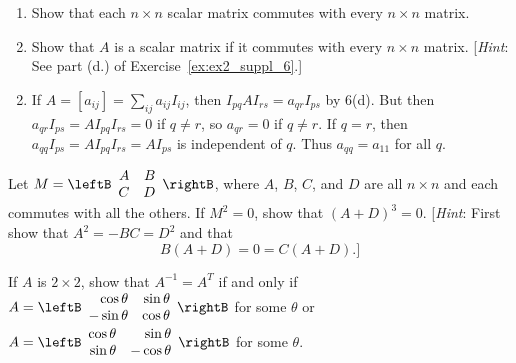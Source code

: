 \begin{multicols}{2}
\begin{supex}
\begin{enumerate}[label={\alph*.}]
\item Show that each $n \times n$ scalar matrix commutes with every $n \times n$ matrix.

\item Show that $A$ is a scalar matrix if it commutes with every $n \times n$ matrix. [\textit{Hint}: See part (d.) of Exercise~\ref{ex:ex2_suppl_6}.]

\end{enumerate}
\begin{supsol}
\begin{enumerate}[label={\alph*.}]
\setcounter{enumi}{1}
\item  If $A = \left[a_{ij}\right] = \sum_{ij}a_{ij}I_{ij}$, then $I_{pq}AI_{rs} = a_{qr}I_{ps}$ by 6(d). But then $a_{qr}I_{ps} = AI_{pq}I_{rs} = 0$ if $q \neq r$, so $a_{qr} = 0$ if $q \neq r$. If $q = r$, then $a_{qq}I_{ps} = AI_{pq}I_{rs} = AI_{ps}$ is independent of $q$. Thus $a_{qq} = a_{11}$ for all $q$.

\end{enumerate}
\end{supsol}
\end{supex}

\begin{supex}
Let $M = \leftB \begin{array}{rr}
A & B \\
C & D
\end{array} \rightB$,
 where $A$, $B$, $C$, and $D$ are all $n \times n$ and each commutes with all the others. If $M^{2} = 0$, show that $(A + D)^{3} = 0$. [\textit{Hint}: First show that $A^{2} = -BC = D^{2}$ and that 
\begin{equation*}
B(A + D) = 0 = C(A + D).]
\end{equation*}


\end{supex}

\begin{supex}
If $A$ is $2 \times 2$, show that $A^{-1} = A^{T}$ if and only if $A = \leftB \begin{array}{rr}
\cos \theta & \sin \theta \\
-\sin \theta & \cos \theta
\end{array} \rightB$
 for some $\theta$ or \newline $A = \leftB \begin{array}{rr}
 \cos \theta & \sin \theta \\
 \sin \theta & -\cos \theta
 \end{array} \rightB$
 for some $\theta$.



\end{supex}
\end{multicols}
